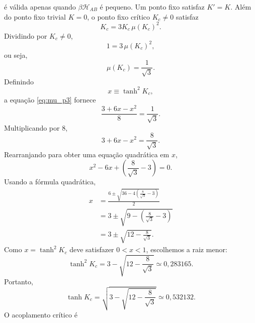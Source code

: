 \documentclass[12pt,a4paper]{article}
\begin{document}
é válida apenas quando \(\beta\mathcal H_{AB}\) é pequeno. Um ponto fixo satisfaz \(K'=K\). Além do ponto fixo trivial \(K=0\),
o ponto fixo crítico \(K_c\neq0\) satisfaz
%
\begin{equation}
    K_c
    =
    3K_c\,\mu(K_c)^2.
    \label{eq:fixed_p3}
\end{equation}
%
Dividindo por \(K_c\neq0\),
%
\begin{equation}
    1
    =
    3\,\mu(K_c)^2,
\end{equation}
%
ou seja,
%
\begin{equation}
    \boxed{
    \mu(K_c)=\frac{1}{\sqrt{3}}.
    }
    \label{eq:mu_c_p3}
\end{equation}
%
Definindo
%
\begin{equation}
    x\equiv \tanh^2 K_c,
    \label{eq:x_def_p3}
\end{equation}
%
a equação \eqref{eq:mu_p3} fornece
%
\begin{equation}
    \frac{3+6x-x^2}{8}
    =
    \frac{1}{\sqrt{3}}.
    \label{eq:eq_Kc_p3}
\end{equation}
%
Multiplicando por \(8\),
%
\begin{equation}
    3+6x-x^2
    =
    \frac{8}{\sqrt{3}}.
\end{equation}
%
Rearranjando para obter uma equação quadrática em \(x\),
%
\begin{equation}
    x^2-6x+\left(\frac{8}{\sqrt{3}}-3\right)=0.
    \label{eq:quadratic_x_p3}
\end{equation}
%
Usando a fórmula quadrática,
%
\begin{align}
    x
    &=
    \frac{
        6\pm\sqrt{36-4\left(\frac{8}{\sqrt{3}}-3\right)}
    }{2}
    \nonumber\\[4pt]
    &=
    3\pm\sqrt{9-\left(\frac{8}{\sqrt{3}}-3\right)}
    \nonumber\\[4pt]
    &=
    3\pm\sqrt{12-\frac{8}{\sqrt{3}}}.
    \label{eq:roots_x_p3}
\end{align}
%
Como \(x=\tanh^2K_c\) deve satisfazer \(0<x<1\), escolhemos a raiz
menor:
%
\begin{equation}
    \tanh^2K_c
    =
    3-\sqrt{12-\frac{8}{\sqrt{3}}}
    \simeq
    0{,}283165. \label{eq:tanh2_Kc_p3}
\end{equation}
%
Portanto,
%
\begin{equation}
    \tanh K_c
    =
    \sqrt{
        3-\sqrt{12-\frac{8}{\sqrt{3}}}
    }
    \simeq
    0{,}532132.
    \label{eq:tanh_Kc_p3}
\end{equation}
%
O acoplamento crítico é
\end{document}

